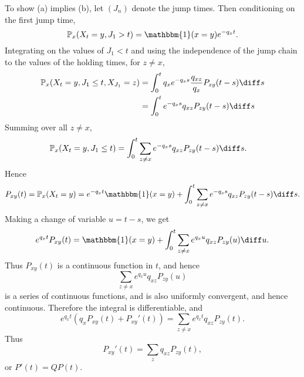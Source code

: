 \documentclass[12pt]{article}
\begin{document}
\begin{proofbox}
	To show (a) implies (b), let $(J_n)$ denote the jump times. Then conditioning on the first jump time,
	\[
		\mathbb{P}_x(X_t = y, J_1 > t) = \mathbbm{1}(x = y) e^{-q_xt}
	.\]
	Integrating on the values of $J_1 < t$ and using the independence of the jump chain to the values of the holding times, for $z \neq x$,
	\begin{align*}
		\mathbb{P}_x(X_t = y, J_1 \leq t, X_{J_1} = z) &= \int_{0}^{t} q_x e^{-q_x s} \frac{q_{xz}}{q_{x}} P_{zy}(t-s) \diff s \\
							       &= \int_{0}^{t} e^{-q_x s} q_{xz} P_{zy}(t-s) \diff s
	\end{align*}
	Summing over all $z \neq x$,
	\begin{align*}
		\mathbb{P}_x(X_t = y, J_1 \leq t) &= \int_{0}^{t} \sum_{z \neq x} e^{-q_x s} q_{xz} P_{zy}(t - s) \diff s.
	\end{align*}
	Hence
	\[
		P_{xy}(t) = \mathbb{P}_x(X_t = y) = e^{-q_x t} \mathbbm{1}(x = y) + \int_{0}^{t} \sum_{z \neq x} e^{-q_x s} q_{xz} P_{zy}(t - s) \diff s
	.\]
	Making a change of variable $u = t-s$, we get
	\[
		e^{q_x t} P_{xy}(t) = \mathbbm{1}(x=y) + \int_{0}^{t} \sum_{z \neq x} e^{q_x u} q_{xz} P_{zy}(u) \diff u
	.\]
	Thus $P_{xy}(t)$ is a continuous function in $t$, and hence
	\[
	\sum_{z \neq x} e^{q_x u} q_{xz} P_{zy}(u)
	\]
	is a series of continuous functions, and is also uniformly convergent, and hence continuous. Therefore the integral is differentiable, and
	\[
	e^{q_xt}(q_x P_{xy}(t) + P_{xy}'(t)) = \sum_{z \neq x} e^{q_xt} q_{xz} P_{zy}(t)
	.\]
	Thus
	\[
	P_{xy}'(t) = \sum_{z} q_{xz} P_{zy}(t)
	,\]
	or $P'(t) = QP(t)$.


\end{proofbox}
\end{document}
